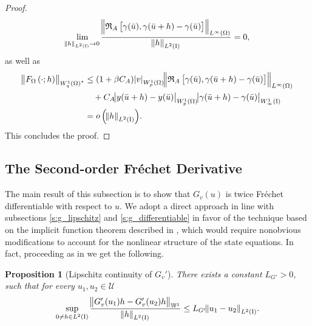 \documentclass[final]{siamltex}
\newtheorem{prop}[theorem]{Proposition}
\begin{document}
\begin{proof}
	\begin{align*}
 		\lim_{{\norm{{h}}_{{L^2\del{{{\text{\rm I}}}}}}} \to 0} \frac{{\norm{{{\mathfrak{R}}_A\sbr{\gamma({\bar{u}}), \gamma({\bar{u}}+h) - \gamma({\bar{u}})}}}_{{L^\infty\del{{\Omega}}}}}}{{\norm{{h}}_{{L^2\del{{{\text{\rm I}}}}}}}}  = 0,
 	\end{align*}
as well as 
	\begin{align*}
		{\norm{{F_\Omega\del{\cdot;h}}}_{{{W^{{1}}_{{q}}\del{{\Omega}}}}^*}}
			&\leq \del{1+\beta C_A}{\abs{{v}}_{{W^{{1}}_{{p}}\del{{\Omega}}}}}{\norm{{{\mathfrak{R}}_A\sbr{\gamma({\bar{u}}), \gamma({\bar{u}}+h) - \gamma({\bar{u}})}}}_{{L^\infty\del{{\Omega}}}}} \\
			&\quad+ C_A{\abs{{y({\bar{u}} + h) - y({\bar{u}})}}_{{W^{{1}}_{{p}}\del{{\Omega}}}}}{\abs{{\gamma({\bar{u}}+h)-\gamma({\bar{u}})}}_{{W^{{1}}_{{\infty}}\del{{\text{\rm I}}}}}} \\
			&= {\mathop{o}\del{{{{\norm{{h}}_{{L^2\del{{{\text{\rm I}}}}}}}}}}}.
	\end{align*}
This concludes the proof.
\end{proof}

\subsection{The Second-order Fr{\'e}chet Derivative}
\label{s:g_twice_diff}
The main 
result of this subsection is to show that $G_v(u)$ is twice Fr\'echet differentiable
with respect to $u$. 
We adopt a direct approach in line with subsections \ref{s:g_lipschitz}
and \ref{s:g_differentiable} in favor of the technique based on the implicit function theorem described in \cite[pp. 239-240]{FTroltzsch_2010a}, which would
require nonobvious modifications to account for the nonlinear 
structure of the state equations.
In fact, proceeding as in  we get the following.
\begin{prop}[Lipschitz continuity of $G_v'$]\label{prop:g_twice_diff_u} There exists a constant 
$L_{G'} > 0$, such that for every $u_1, u_2 \in {\mathcal{U}}$
	\begin{equation}\label{eq:g_twice_diff_u}
		\sup_{0\neq h \in L^2({\text{\rm I}})}\frac{\norm{G'_v(u_1)h - G'_v(u_2)h}_{{\mathbb{W}}^1}}{{\norm{{h}}_{{L^2\del{{{\text{\rm I}}}}}}}} \leq L_{G'}{\norm{{u_1-u_2}}_{{L^2\del{{{\text{\rm I}}}}}}}.
	\end{equation}
\end{prop}
\end{document}
